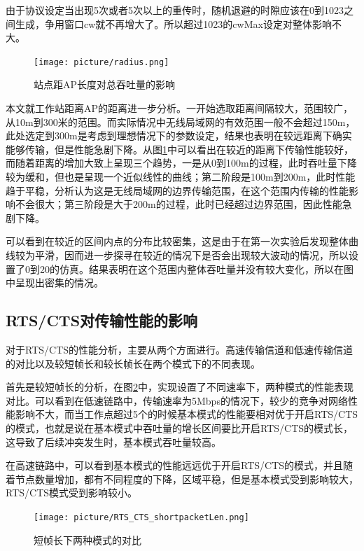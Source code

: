\documentclass{article}
\begin{document}
由于协议设定当出现5次或者5次以上的重传时，随机退避的时隙应该在0到1023之间生成，争用窗口cw就不再增大了。所以超过1023的cwMax设定对整体影响不大。

\begin{figure}[ht]
	\centering
	\texttt{[image: picture/radius.png]}
	\caption{站点距AP长度对总吞吐量的影响}
	\label{fig:radius}
\end{figure}

本文就工作站距离AP的距离进一步分析。一开始选取距离间隔较大，范围较广，从10m到300米的范围。而实际情况中无线局域网的有效范围一般不会超过150m，此处选定到300m是考虑到理想情况下的参数设定，结果也表明在较远距离下确实能够传输，但是性能急剧下降。从图\ref{fig:radius}中可以看出在较近的距离下传输性能较好，而随着距离的增加大致上呈现三个趋势，一是从0到100m的过程，此时吞吐量下降较为缓和，但也是呈现一个近似线性的曲线；第二阶段是100m到200m，此时性能趋于平稳，分析认为这是无线局域网的边界传输范围，在这个范围内传输的性能影响不会很大；第三阶段是大于200m的过程，此时已经超过边界范围，因此性能急剧下降。

可以看到在较近的区间内点的分布比较密集，这是由于在第一次实验后发现整体曲线较为平滑，因而进一步探寻在较近的情况下是否会出现较大波动的情况，所以设置了0到20的仿真。结果表明在这个范围内整体吞吐量并没有较大变化，所以在图中呈现出密集的情况。
\subsection{RTS/CTS对传输性能的影响}

对于RTS/CTS的性能分析，主要从两个方面进行。高速传输信道和低速传输信道的对比以及较短帧长和较长帧长在两个模式下的不同表现。

首先是较短帧长的分析，在图\ref{fig:RTS_CTS_shortpacketLen}中，实现设置了不同速率下，两种模式的性能表现对比。可以看到在低速链路中，传输速率为5Mbps的情况下，较少的竞争对网络性能影响不大，而当工作点超过5个的时候基本模式的性能要相对优于开启RTS/CTS的模式，也就是说在基本模式中吞吐量的增长区间要比开启RTS/CTS的模式长，这导致了后续冲突发生时，基本模式吞吐量较高。

在高速链路中，可以看到基本模式的性能远远优于开启RTS/CTS的模式，并且随着节点数量增加，都有不同程度的下降，区域平稳，但是基本模式受到影响较大，RTS/CTS模式受到影响较小。

\begin{figure}[ht]
	\centering
	\texttt{[image: picture/RTS\_CTS\_shortpacketLen.png]}
	\caption{短帧长下两种模式的对比}
	\label{fig:RTS_CTS_shortpacketLen}
\end{figure}
\end{document}
